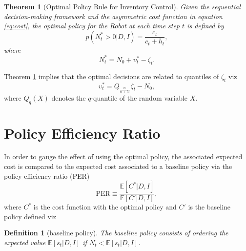 \documentclass[a4paper,12pt]{article}
\newtheorem{theorem}{Theorem}
\newtheorem{definition}{Definition}
\begin{document}
	\begin{theorem}[Optimal Policy Rule for Inventory Control]
		\label{theorem:opt_policy}
		Given the sequential decision-making framework and the asymmetric cost function in equation \eqref{eq:cost}, the optimal policy for the Robot at each time step $t$ is defined by
		\begin{equation}
			p(N_t^* > 0 | D, I) = \frac{c_t}{c_t + h_t},
		\end{equation}
		where
		\begin{equation}
			N_t^* = N_0 +\upsilon_t^*-\zeta_t.
		\end{equation}
	\end{theorem}
	
	Theorem \ref{theorem:opt_policy} implies that the optimal decisions are related to quantiles of $\zeta_t$ viz
	\begin{equation}
		\upsilon_t^* = Q_{\frac{c_t}{c_t+h_t}}\zeta_t-N_0,
		\label{eq:opt}
	\end{equation}
	where $Q_q(X)$ denotes the $q$-quantile of the random variable $X$. 
	
	\section{Policy Efficiency Ratio}
	In order to gauge the effect of using the optimal policy, the associated expected cost is compared to the expected cost associated to a baseline policy via the policy efficiency ratio (PER)
	\begin{equation}
		\text{PER}\equiv \frac{\mathbb{E}[C^*|D,I]}{\mathbb{E}[C'|D,I]},
	\end{equation}
	where $C^*$ is the cost function with the optimal policy and $C'$ is the baseline policy defined viz
	
	\begin{definition}[baseline policy]
		The baseline policy consists of ordering the expected value $\mathbb{E}[s_t|D,I]$ if $N_t<\mathbb{E}[s_t|D,I]$.
	\end{definition}
	
\end{document}
